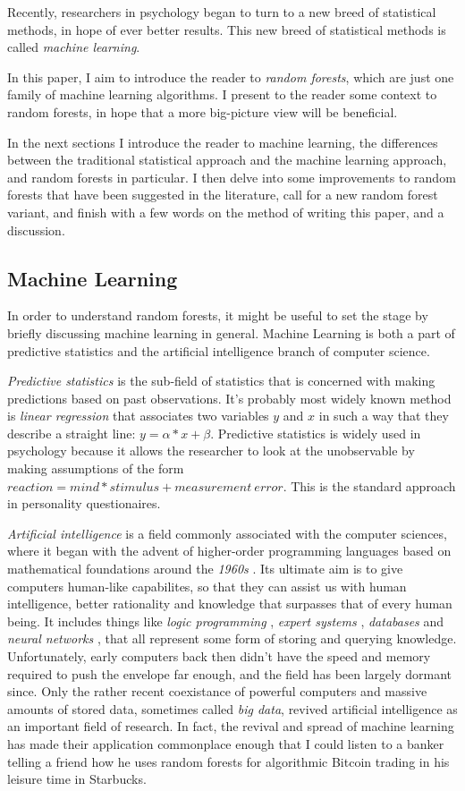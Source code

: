 \documentclass[a4paper,man,12pt,apacite,floatsintext,draftfirst]{apa6} %
\begin{document}
Recently, researchers in psychology began to turn to a new breed of
statistical methods, in hope of ever better results. This new breed of
statistical methods is called \emph{machine learning}.

In this paper, I aim to introduce the reader to \emph{random forests},
which are just one family of machine learning algorithms.
I present to the reader some context to random forests, in hope that a more
big-picture view will be beneficial.

In the next sections I introduce the reader to machine learning,
the differences between the traditional statistical approach and the
machine learning approach, and random forests in particular.
I then delve into some improvements to random forests that have been
suggested in the literature, call for a new random forest variant, and finish
with a few words on the method of writing this paper, and a discussion.

\subsection{Machine Learning}
In order to understand random forests, it might be useful to set
the stage by briefly discussing machine learning in general.
Machine Learning is both a part of predictive statistics and the
artificial intelligence branch of computer science.

\emph{Predictive statistics} is the sub-field of statistics that is
concerned with making predictions based on past observations.
It's probably most widely known method is \emph{linear regression}
\cite{wpLR} that associates two variables \(y\) and \(x\) in such a way
that they describe a straight line: \(y = \alpha * x + \beta \).
Predictive statistics is widely used in psychology because it
allows the researcher to look at the unobservable by making
assumptions of the form \(reaction = mind * stimulus + measurement\ error \).
This is the standard approach in personality questionaires.

\emph{Artificial intelligence} is a field commonly associated with the
computer sciences, where it began with the advent of higher-order
programming languages based on mathematical foundations around the \emph{1960s} \cite{wpHOPL}.
Its ultimate aim is to give computers human-like capabilites,
so that they can assist us with human intelligence, better rationality
and knowledge that surpasses that of every human being.
It includes things like \emph{logic programming} \cite{wpLP},
\emph{expert systems} \cite{wpES}, \emph{databases} \cite{wpDB} and
\emph{neural networks} \cite{wpNN}, that all represent some form of
storing and querying knowledge.
Unfortunately, early computers back then didn't have the speed and memory
required to push the envelope far enough, and the field has been
largely dormant since.
Only the rather recent coexistance of powerful computers and massive amounts
of stored data, sometimes called \emph{big data}, revived artificial
intelligence as an important field of research.
In fact, the revival and spread of machine learning has made their application
commonplace enough that I could listen to a banker telling a friend how
he uses random forests for algorithmic Bitcoin trading in his leisure time
in Starbucks.
\end{document}
